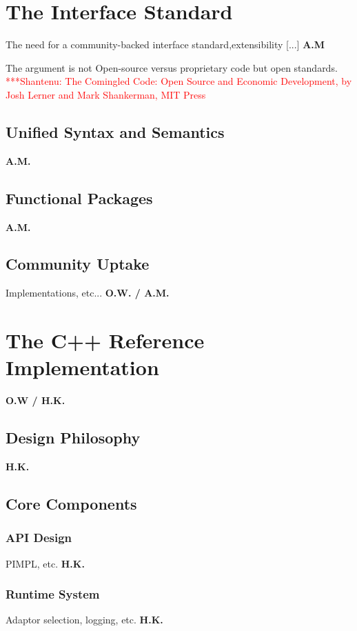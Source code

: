\documentclass[a4paper,10pt]{article}
\newcommand{\jhanote}[1]{  {\textcolor{red}     { ***Shantenu: #1 }}}
\newcommand{\jhanote}[1]{}
\begin{document}
 

 
 \section{The Interface Standard}

 The need for a community-backed interface standard,extensibility
 [...] \textbf{A.M}


 The argument is not Open-source versus proprietary code but open
 standards. \jhanote{The Comingled Code: Open Source and Economic
   Development, by Josh Lerner and Mark Shankerman, MIT Press}

 \subsection{Unified Syntax and Semantics}
 \textbf{A.M.}
 
 \subsection{Functional Packages}
 \textbf{A.M.}

 \subsection{Community Uptake}
 Implementations, etc... \textbf{O.W. / A.M.}

 \section{The C++ Reference Implementation}
 \textbf{O.W / H.K.}
 
 \subsection{Design Philosophy}
 \textbf{H.K.}

 \subsection{Core Components}
 
 \subsubsection{API Design}
 PIMPL, etc. \textbf{H.K.}
 
 \subsubsection{Runtime System}
 Adaptor selection, logging, etc. \textbf{H.K.}
\end{document}
